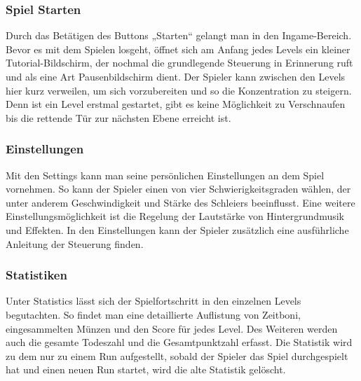 \documentclass[10pt]{article}
\begin{document}
\vspace{0.5cm}
\subsubsection{Spiel Starten}

Durch das Betätigen des Buttons „Starten“ gelangt man in den Ingame-Bereich. Bevor es mit dem Spielen losgeht, öffnet sich am Anfang jedes
Levels ein kleiner Tutorial-Bildschirm, der nochmal die grundlegende Steuerung in Erinnerung ruft und als eine Art Pausenbildschirm dient. Der Spieler kann zwischen den Levels hier kurz verweilen, um sich vorzubereiten und so die Konzentration zu steigern. Denn ist ein Level erstmal gestartet, gibt es keine Möglichkeit zu Verschnaufen bis die rettende Tür zur nächsten Ebene erreicht ist.

\vspace{0.5cm}
\subsubsection{Einstellungen}

Mit den Settings kann man seine persönlichen Einstellungen an dem Spiel vornehmen. So kann der Spieler einen von vier Schwierigkeitsgraden wählen, der unter anderem Geschwindigkeit und Stärke des Schleiers beeinflusst. \newline
Eine weitere Einstellungsmöglichkeit ist die Regelung der Lautstärke von Hintergrundmusik und Effekten. \newline
In den Einstellungen kann der Spieler zusätzlich eine ausführliche Anleitung der Steuerung finden.

\newpage
\vspace{0.5cm}
\subsubsection{Statistiken}

Unter Statistics lässt sich der Spielfortschritt in den einzelnen Levels begutachten. So findet man eine detaillierte Auflistung von Zeitboni, eingesammelten Münzen und den Score für jedes Level. Des Weiteren werden auch die gesamte Todeszahl und die Gesamtpunktzahl erfasst. Die Statistik wird zu dem  nur zu einem Run aufgestellt, sobald der Spieler das Spiel durchgespielt hat und einen neuen Run startet, wird die alte Statistik gelöscht.
\end{document}
